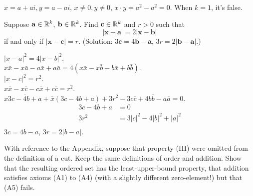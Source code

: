 \mySolve
$x = a+ai, y = a-ai$, $x \neq 0, y \neq 0$, $x\cdot y = a^2-a^2=0$.
When $k=1$, it's false.


\begin{myExercise}
    \label{ex:1.19}
    Suppose $\mathbf{a} \in {\protect\mathbb R}^k$, $\mathbf{b} \in{\protect\mathbb R}^k$. Find $\mathbf{c} \in {\protect\mathbb R}^k$ and $r > 0$ such that
    \begin{equation*}
        |\mathbf{x} - \mathbf{a}| = 2|\mathbf{x} - \mathbf{b}|
    \end{equation*}
    if and only if $|\mathbf{x} - \mathbf{c}| = r$.
    (Solution: $3\mathbf{c} =4\mathbf{b}-\mathbf{a}$, $3r =2|\mathbf{b}-\mathbf{a}|$.)
\end{myExercise}

\mySolve
$|x-a|^2 = 4|x-b|^2$.\\
$x\bar{x} - x\bar{a} - a\bar{x} + a\bar{a} = 4(x\bar{x} - x\bar{b} - b\bar{x} + b\bar{b})$.\\
$|x-c|^2 = r^2$.\\
$x\bar{x} - x\bar{c} - c\bar{x} + c\bar{c} = r^2$.\\
$x\overline{3c-4b+a}+\bar{x}(3c-4b+a)+3r^2-3c\bar{c}+4b\bar{b}-a\bar{a} = 0$.
\begin{align*}
    3c-4b+a&=0\\
    3r^2 &= 3|c|^2 - 4|b|^2 + |a|^2 \\
\end{align*}
$3c = 4b-a$, $3r = 2|b-a|$.


\begin{myExercise}
    \label{ex:1.20}
    With reference to the Appendix, suppose that property (III) were omitted from the
    definition of a cut. Keep the same definitions of order and addition. Show that
    the resulting ordered set has the least-upper-bound property, that addition satisfies
    axioms (A1) to (A4) (with a slightly different zero-element!) but that (A5) fails.
\end{myExercise}

\mySolve


